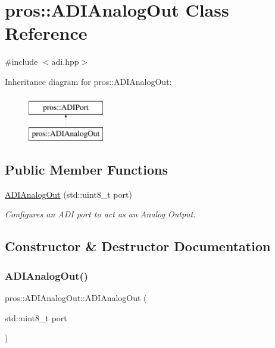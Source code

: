 \hypertarget{classpros_1_1ADIAnalogOut}{}\section{pros\+:\+:A\+D\+I\+Analog\+Out Class Reference}
\label{classpros_1_1ADIAnalogOut}


{\ttfamily \#include $<$adi.\+hpp$>$}

Inheritance diagram for pros\+:\+:A\+D\+I\+Analog\+Out\+:\begin{figure}[H]
\begin{center}
\leavevmode
\includegraphics[height=2.000000cm]{classpros_1_1ADIAnalogOut}
\end{center}
\end{figure}
\subsection*{Public Member Functions}
\begin{DoxyCompactItemize}
\item 
\hyperlink{classpros_1_1ADIAnalogOut_a1758096961a060dea379bd696c293d26}{A\+D\+I\+Analog\+Out} (std\+::uint8\+\_\+t port)
\begin{DoxyCompactList}\small\item\em Configures an A\+DI port to act as an Analog Output. \end{DoxyCompactList}\end{DoxyCompactItemize}


\subsection{Constructor \& Destructor Documentation}
\mbox{\label{classpros_1_1ADIAnalogOut_a1758096961a060dea379bd696c293d26}} 
\subsubsection{\texorpdfstring{A\+D\+I\+Analog\+Out()}{ADIAnalogOut()}}
{\footnotesize\ttfamily pros\+::\+A\+D\+I\+Analog\+Out\+::\+A\+D\+I\+Analog\+Out (\begin{DoxyParamCaption}\item[{std\+::uint8\+\_\+t}]{port }\end{DoxyParamCaption})}



